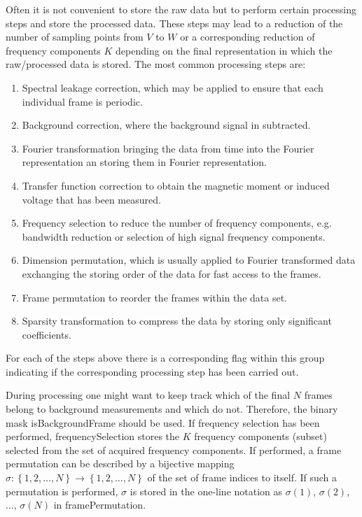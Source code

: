 \documentclass[landscape,a4paper]{article} %
\newcommand{\inlvar}[1]{{\ttfamily#1}}
\begin{document}
\begin{multicols}{2}
Often it is not convenient to store the raw data but to perform certain processing steps and store the processed data. These steps may lead to a reduction of the number of sampling points from $V$ to $W$ or a corresponding reduction of frequency components $K$ depending on the final representation in which the raw/processed data is stored. The most common processing steps are:
\begin{enumerate}
	\item Spectral leakage correction, which may be applied to ensure that each individual frame is periodic.
	\item Background correction, where the background signal in subtracted.
	\item Fourier transformation bringing the data from time into the Fourier representation an storing them in Fourier representation.
	\item Transfer function correction to obtain the magnetic moment or induced voltage that has been measured.
	\item Frequency selection to reduce the number of frequency components, e.g. bandwidth reduction or selection of high signal frequency components.
	\item Dimension permutation, which is usually applied to Fourier transformed data exchanging the storing order of the data for fast access to the frames.
	\item Frame permutation to reorder the frames within the data set.
	\item Sparsity transformation to compress the data by storing only significant coefficients.
\end{enumerate}
For each of the steps above there is a corresponding flag within this group indicating if the corresponding processing step has been carried out. 

During processing one might want to keep track which of the final $N$ frames belong to background measurements and which do not. Therefore, the binary mask \inlvar{isBackgroundFrame} should be used. If frequency selection has been performed, \inlvar{frequencySelection} stores the $K$ frequency components (subset) selected from the set of acquired frequency components. If performed, a frame permutation can be described by a bijective mapping $\sigma : \left\{ 1,2,\dots,N \right\} \rightarrow \left\{ 1,2,\dots,N \right\}$ of the set of frame indices to itself. If such a permutation is performed, $\sigma$ is stored in the one-line notation as $\sigma(1)$, $\sigma(2)$, $\dots$, $\sigma(N)$ in \inlvar{framePermutation}.


\end{multicols}
\end{document}
